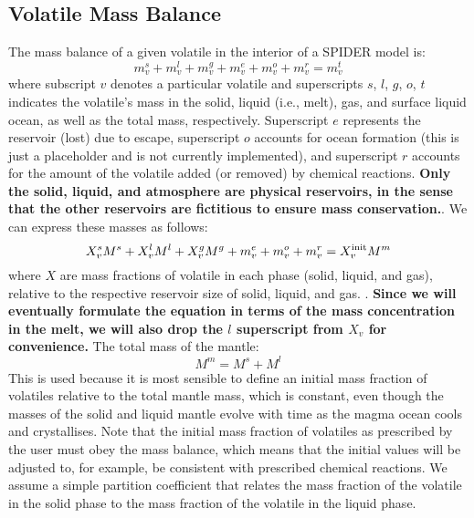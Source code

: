 
\noindent {}
\subsection{Volatile Mass Balance}
The mass balance of a given volatile in the interior of a SPIDER model \citep[e.g.,][]{LMC13} is:
\begin{equation}
m_v^s + m_v^l + m_v^g + m_v^e + m_v^o + m_v^r= m_v^t
\end{equation}
where subscript $v$ denotes a particular volatile and superscripts $s$, $l$, $g$, $o$, $t$ indicates the volatile's mass in the solid, liquid (i.e., melt), gas, and surface liquid ocean, as well as the total mass, respectively.  Superscript $e$ represents the reservoir (lost) due to escape, superscript $o$ accounts for ocean formation (this is just a placeholder and is not currently implemented), and superscript $r$ accounts for the amount of the volatile added (or removed) by chemical reactions.  \textbf{Only the solid, liquid, and atmosphere are physical reservoirs, in the sense that the other reservoirs are fictitious to ensure mass conservation.}. We can express these masses as follows:
\begin{equation}
X_v^s M^s + X_v^l M^l + X_v^g M^g + m_v^e + m_v^o + m_v^r = X_v^{\rm init} M^m
\end{equation}
where $X$ are mass fractions of volatile in each phase (solid, liquid, and gas), relative to the respective  reservoir size of solid, liquid, and gas.  .  \textbf{Since we will eventually formulate the equation in terms of the mass concentration in the melt, we will also drop the $l$ superscript from $X_v$ for convenience.} The total mass of the mantle:
\begin{equation}
M^m = M^s + M^l
\end{equation}
This is used because it is most sensible to define an initial mass fraction of volatiles relative to the total mantle mass, which is constant, even though the masses of the solid and liquid mantle evolve with time as the magma ocean cools and crystallises.  Note that the initial mass fraction of volatiles as prescribed by the user must obey the mass balance, which means that the initial values will be adjusted to, for example, be consistent with prescribed chemical reactions.  We assume a simple partition coefficient that relates the mass fraction of the volatile in the solid phase to the mass fraction of the volatile in the liquid phase.

